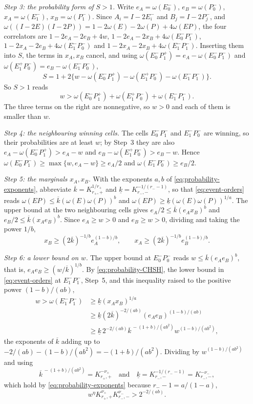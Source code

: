 \documentclass[aps,prl,reprint,longbibliography,raggedbottom]{revtex4-2}
\begin{document}
\emph{Step 3: the probability form of $S>1$.} Write
$e_A=\omega(E_0^-)$, $e_B=\omega(P_0^-)$, $x_A=\omega(E_1^-)$,
$x_B=\omega(P_1^-)$. Since $A_i=I-2E_i^-$ and $B_j=I-2P_j^-$, and
$\omega((I-2E)(I-2P))=1-2\omega(E)-2\omega(P)+4\omega(EP)$, the four
correlators are $1-2e_A-2e_B+4w$, $1-2e_A-2x_B+4\omega(E_0^-P_1^-)$,
$1-2x_A-2e_B+4\omega(E_1^-P_0^-)$ and $1-2x_A-2x_B+4\omega(E_1^-P_1^-)$.
Inserting them into $S$, the terms in $x_A,x_B$ cancel, and using
$\omega(E_0^-P_1^+)=e_A-\omega(E_0^-P_1^-)$ and
$\omega(E_1^+P_0^-)=e_B-\omega(E_1^-P_0^-)$,
\[
S=1+2\bigl\{w-\omega(E_0^-P_1^+)-\omega(E_1^+P_0^-)-\omega(E_1^-P_1^-)\bigr\}.
\]
So $S>1$ reads
\begin{equation}
w>\omega(E_0^-P_1^+)+\omega(E_1^+P_0^-)+\omega(E_1^-P_1^-).
\label{eq:probability-CHSH}
\end{equation}
The three terms on the right are nonnegative, so $w>0$ and each of them
is smaller than $w$.

\emph{Step 4: the neighbouring winning cells.} The cells $E_0^-P_1^-$
and $E_1^-P_0^-$ are winning, so their probabilities are at least
$w$; by Step~3 they are also $e_A-\omega(E_0^-P_1^+)>e_A-w$ and
$e_B-\omega(E_1^+P_0^-)>e_B-w$. Hence
$\omega(E_0^-P_1^-)\ge\max\{w,e_A-w\}\ge e_A/2$ and
$\omega(E_1^-P_0^-)\ge e_B/2$.

\emph{Step 5: the marginals $x_A,x_B$.} With the exponents $a,b$ of
\eqref{eq:probability-exponents}, abbreviate $\overline k=K_{r_+,+}^{1/r_+}$ and
$\underline k=K_{r_-,-}^{-1/(r_--1)}$, so that \eqref{eq:event-orders} reads
$\omega(EP)\le\overline k(\omega(E)\omega(P))^{b}$ and
$\omega(EP)\ge\underline k(\omega(E)\omega(P))^{1/a}$. The upper bound at
the two neighbouring cells gives
$e_A/2\le\overline k(e_Ax_B)^b$ and $e_B/2\le\overline k(x_Ae_B)^b$. Since
$e_A\ge w>0$ and $e_B\ge w>0$, dividing and taking the power $1/b$,
\[
x_B\ge(2\overline k)^{-1/b}e_A^{(1-b)/b},\qquad x_A\ge(2\overline k)^{-1/b}e_B^{(1-b)/b}.
\]

\emph{Step 6: a lower bound on $w$.} The upper bound at $E_0^-P_0^-$
reads $w\le\overline k(e_Ae_B)^b$, that is, $e_Ae_B\ge(w/\overline k)^{1/b}$. By
\eqref{eq:probability-CHSH}, the lower bound in
\eqref{eq:event-orders} at $E_1^-P_1^-$, Step~5, and this inequality
raised to the positive power $(1-b)/(ab)$,
\begin{align*}
w>\omega(E_1^-P_1^-)&\ge\underline k(x_Ax_B)^{1/a}\\
&\ge\underline k(2\overline k)^{-2/(ab)}(e_Ae_B)^{(1-b)/(ab)}\\
&\ge\underline k\,2^{-2/(ab)}\overline k^{\,-(1+b)/(ab^2)}w^{(1-b)/(ab^2)},
\end{align*}
the exponents of $\overline k$ adding up to $-2/(ab)-(1-b)/(ab^2)=-(1+b)/(ab^2)$.
Dividing by $w^{(1-b)/(ab^2)}$ and using
\[
\overline k^{\,-(1+b)/(ab^2)}=K_{r_+,+}^{-\nu_+}\quad\text{and}\quad
\underline k=K_{r_-,-}^{-1/(r_--1)}=K_{r_-,-}^{-\nu_-},
\]
which hold by
\eqref{eq:probability-exponents} because $r_--1=a/(1-a)$,
\begin{equation}
w^\eta K_{r_+,+}^{\nu_+}K_{r_-,-}^{\nu_-}>2^{-2/(ab)}.
\label{eq:necessary-cell}
\end{equation}
\end{document}
